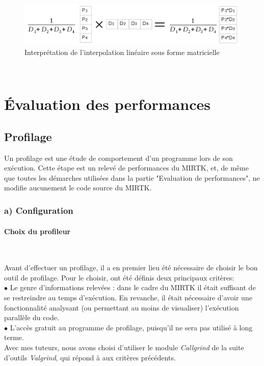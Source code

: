 \documentclass[10pt]{report}
\begin{document}
	\begin{figure}[h!]
		\begin{center}
			\includegraphics[width=16cm]{calcul_interp_lineaire.png}	
		\end{center}
		\caption{Interprétation de l'interpolation linéaire sous forme matricielle}
		\label{Interprétation de l'interpolation linéaire sous forme matricielle}
	\end{figure}
	~\par 

	

	\section{Évaluation des performances}
	\vspace{0.7cm}
		\subsection{Profilage}
Un profilage est une étude de comportement d'un programme lors de son exécution. Cette étape est un relevé de performances du MIRTK, et, de même que toutes les démarches utilisées dans la partie "Evaluation de performances", ne modifie aucunement le code source du MIRTK. 

\subsubsection{a) Configuration}
\vspace{0.7cm}
	\paragraph{Choix du profileur}~\par

Avant d'effectuer un profilage, il a en premier lieu été nécessaire de choisir le bon outil de profilage. Pour le choisir, ont été définis deux principaux critères:\\
{$\bullet$} Le genre d'informations relevées : dans le cadre du MIRTK il était suffisant de se restreindre au temps d'exécution. En revanche, il était nécessaire d'avoir une fonctionnalité analysant (ou permettant au moins de visualiser) l'exécution parallèle du code. \\
{$\bullet$} L'accès gratuit au programme de profilage, puisqu'il ne sera pas utilisé à long terme.\\
Avec mes tuteurs, nous avons choisi d'utiliser le module \textit{Callgrind} de la suite d'outils \textit{Valgrind}, qui répond à aux critères précédents.
\end{document}
